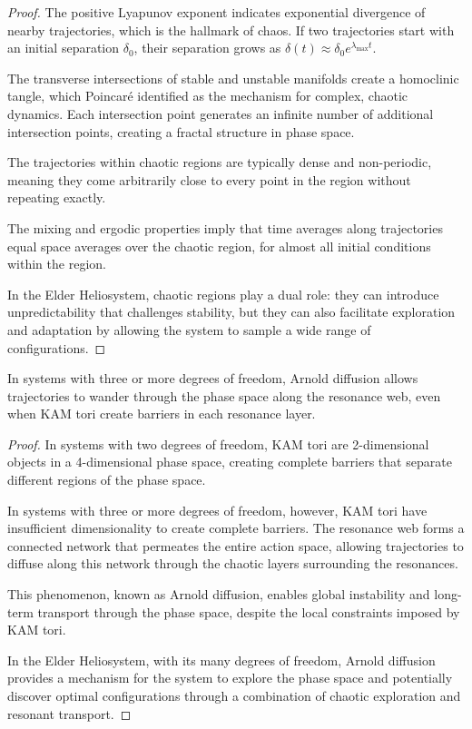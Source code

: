 \begin{proof}
The positive Lyapunov exponent indicates exponential divergence of nearby trajectories, which is the hallmark of chaos. If two trajectories start with an initial separation $\delta_0$, their separation grows as $\delta(t) \approx \delta_0 e^{\lambda_{\max} t}$.

The transverse intersections of stable and unstable manifolds create a homoclinic tangle, which Poincaré identified as the mechanism for complex, chaotic dynamics. Each intersection point generates an infinite number of additional intersection points, creating a fractal structure in phase space.

The trajectories within chaotic regions are typically dense and non-periodic, meaning they come arbitrarily close to every point in the region without repeating exactly.

The mixing and ergodic properties imply that time averages along trajectories equal space averages over the chaotic region, for almost all initial conditions within the region.

In the Elder Heliosystem, chaotic regions play a dual role: they can introduce unpredictability that challenges stability, but they can also facilitate exploration and adaptation by allowing the system to sample a wide range of configurations.
\end{proof}

\begin{theorem}
In systems with three or more degrees of freedom, Arnold diffusion allows trajectories to wander through the phase space along the resonance web, even when KAM tori create barriers in each resonance layer.
\end{theorem}

\begin{proof}
In systems with two degrees of freedom, KAM tori are 2-dimensional objects in a 4-dimensional phase space, creating complete barriers that separate different regions of the phase space.

In systems with three or more degrees of freedom, however, KAM tori have insufficient dimensionality to create complete barriers. The resonance web forms a connected network that permeates the entire action space, allowing trajectories to diffuse along this network through the chaotic layers surrounding the resonances.

This phenomenon, known as Arnold diffusion, enables global instability and long-term transport through the phase space, despite the local constraints imposed by KAM tori.

In the Elder Heliosystem, with its many degrees of freedom, Arnold diffusion provides a mechanism for the system to explore the phase space and potentially discover optimal configurations through a combination of chaotic exploration and resonant transport.
\end{proof}

